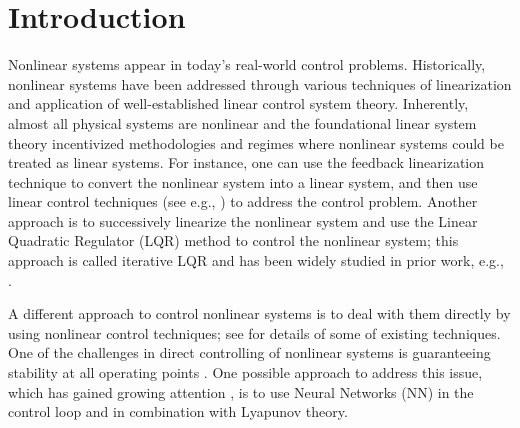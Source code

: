 \documentclass[1p,times]{elsarticle}
\begin{document}
\section{Introduction}\label{sec:Intro}


Nonlinear systems appear in today's real-world control problems. Historically, nonlinear systems have been addressed through various techniques of linearization and application of well-established linear control system theory. Inherently, almost all physical systems are nonlinear and the foundational linear system theory incentivized methodologies and regimes where nonlinear systems could be treated as linear systems. For instance, one can use the feedback linearization technique \cite{KhalilBook,IsidoriBook} to convert the nonlinear system into a linear system, and then use linear control techniques (see e.g., \cite{OgataBook,ChenBook}) to address the control problem. Another approach is to successively linearize the nonlinear system and use the Linear Quadratic Regulator (LQR) method to control the nonlinear system; this approach is called iterative LQR and has been widely studied in prior work, e.g.,
\cite{Li2004,Todorov2005,Rodrigues2011,Prasad2014,Boby2014,Mathiyalagan2019,Chen2017}. 


A different approach to control nonlinear systems is to deal with them directly by using nonlinear control techniques; see \cite{KhalilBook,SastryBook,Rawlings1994,VidyasagarBook} for details of some of existing techniques. One of the challenges in direct controlling of nonlinear systems is guaranteeing stability at all operating points \cite{Hunt2011NeuralNE,Sinha2021AdaptiveRM}.
One possible approach to address this issue, {{{\color{blue}}}which has gained growing attention  \cite{elhaki2020robust,cheng2020neural,zhou2021control,jiang2019design,punish2018},} is to use Neural Networks (NN) in the control loop and in combination with Lyapunov theory. 


\end{document}
